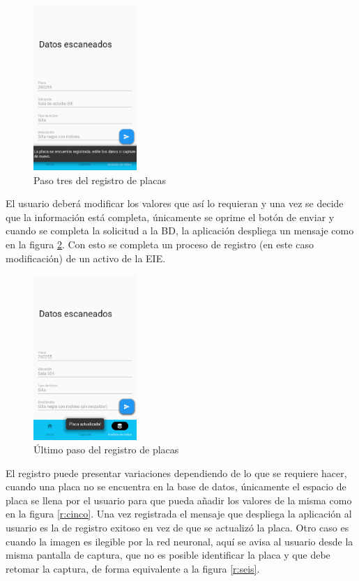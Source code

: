 \begin{figure}[H]
    \centering
    \includegraphics[width=0.35\textwidth]{imagenes/resultados/tres.png}
    \caption{Paso tres del registro de placas}
    \label{r:tres}
\end{figure}
\par
El usuario deberá modificar los valores que así lo requieran y una vez se decide que la información está completa, únicamente se oprime el botón de enviar y cuando se completa la solicitud a la BD, la aplicación despliega un mensaje como en la figura \ref{r:cuatro}. Con esto se completa un proceso de registro (en este caso modificación) de un activo de la EIE. 
\begin{figure}[H]
    \centering
    \includegraphics[width=0.35\textwidth]{imagenes/resultados/cuatro.png}
    \caption{Último paso del registro de placas}
    \label{r:cuatro}
\end{figure}
\par
El registro puede presentar variaciones dependiendo de lo que se requiere hacer, cuando una placa no se encuentra en la base de datos, únicamente el espacio de placa se llena por el usuario para que pueda añadir los valores de la misma como en la figura \ref{r:cinco}. Una vez registrada el mensaje que despliega la aplicación al usuario es la de registro exitoso en vez de que se actualizó la placa. Otro caso es cuando la imagen es ilegible por la red neuronal, aquí se avisa al usuario desde la misma pantalla de captura, que no es posible identificar la placa y que debe retomar la captura, de forma equivalente a la figura \ref{r:seis}.
